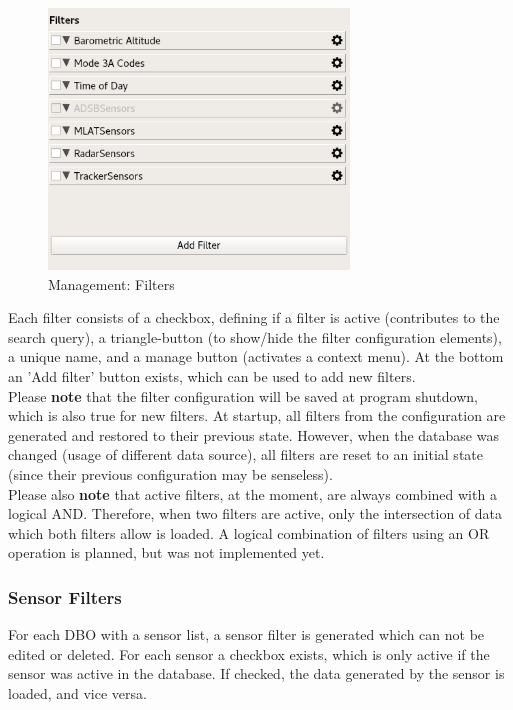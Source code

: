\documentclass[10pt,letterpaper,extrafontsizes]{memoir}
\begin{document}
\begin{figure}[H]
  \center
    \includegraphics[width=8cm,frame]{../screenshots/management_filters.png}
  \caption{Management: Filters}
  \label{fig:management_filters}
\end{figure}

Each filter consists of a checkbox, defining if a filter is active (contributes to the search query), a triangle-button (to show/hide the filter configuration elements), a unique name, and a manage button (activates a context menu). At the bottom an 'Add filter' button exists, which can be used to add new filters. \\

Please \textbf{note} that the filter configuration will be saved at program shutdown, which is also true for new
filters.   At  startup,  all  filters  from  the  configuration  are  generated  and  restored  to  their  previous  state. However, when the database was changed (usage of different data source), all filters are reset to an initial
state (since their previous configuration may be senseless). \\

Please also \textbf{note} that active filters, at the moment, are always combined with a logical AND. Therefore,
when  two  filters  are  active,  only  the  intersection  of  data  which  both  filters  allow  is  loaded.   A  logical combination of filters using an OR operation is planned, but was not implemented yet.

\subsubsection{Sensor Filters}
For each DBO with a sensor list, a sensor filter is generated which can not be edited or deleted.  For each
sensor a checkbox exists, which is only active if the sensor was active in the database.  If checked, the
data generated by the sensor is loaded, and vice versa.
\end{document}
